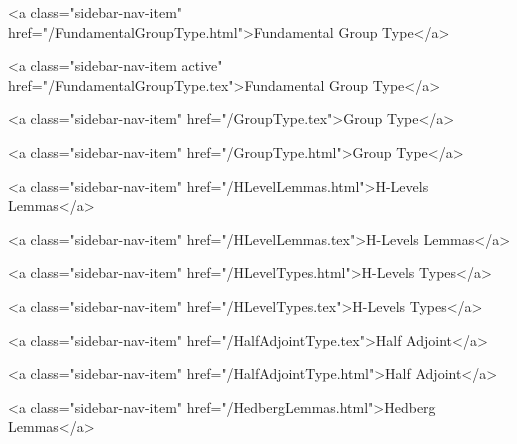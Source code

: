       
        
          <a class="sidebar-nav-item" href="/FundamentalGroupType.html">Fundamental Group Type</a>
        
      
    
      
        
          <a class="sidebar-nav-item active" href="/FundamentalGroupType.tex">Fundamental Group Type</a>
        
      
    
      
        
          <a class="sidebar-nav-item" href="/GroupType.tex">Group Type</a>
        
      
    
      
        
          <a class="sidebar-nav-item" href="/GroupType.html">Group Type</a>
        
      
    
      
        
          <a class="sidebar-nav-item" href="/HLevelLemmas.html">H-Levels Lemmas</a>
        
      
    
      
        
          <a class="sidebar-nav-item" href="/HLevelLemmas.tex">H-Levels Lemmas</a>
        
      
    
      
        
          <a class="sidebar-nav-item" href="/HLevelTypes.html">H-Levels Types</a>
        
      
    
      
        
          <a class="sidebar-nav-item" href="/HLevelTypes.tex">H-Levels Types</a>
        
      
    
      
        
          <a class="sidebar-nav-item" href="/HalfAdjointType.tex">Half Adjoint</a>
        
      
    
      
        
          <a class="sidebar-nav-item" href="/HalfAdjointType.html">Half Adjoint</a>
        
      
    
      
        
          <a class="sidebar-nav-item" href="/HedbergLemmas.html">Hedberg Lemmas</a>
        
